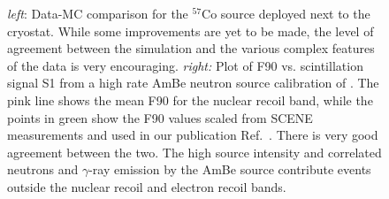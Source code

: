 \begin{figure}[htbp]
\centering
{}
 \caption{\textit{left}: Data-MC comparison for the $^{57}$Co source deployed next to the cryostat. While some improvements are yet to be made, the level of agreement between the simulation and the various complex features of the data is very encouraging.
\textit{right:} Plot of F90 vs. scintillation signal S1 from a high rate AmBe neutron source calibration of \dsf.  The pink line shows the mean F90 for the nuclear recoil band, while the points in green show the F90 values scaled from SCENE measurements and used in our publication Ref.~\cite{ds:ds-50-PLB}. There is very good agreement between the two.  The high source intensity and correlated neutrons and $\gamma$-ray emission by the AmBe source contribute events outside the nuclear recoil and electron recoil bands. 
\label{fig:CalibData:F90}}
 \end{figure}



